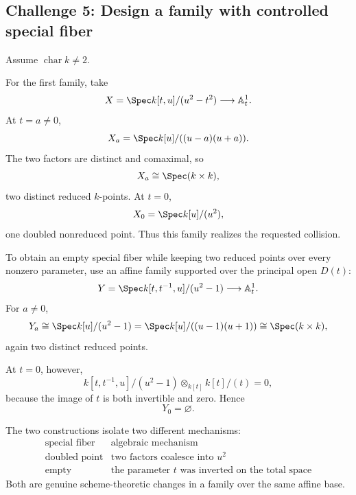 \subsection*{Challenge 5: Design a family with controlled special fiber}
\begin{solution}
Assume \(\operatorname{char}k\ne2\).

For the first family, take
\[
X=\Spec k[t,u]/(u^2-t^2)
\longrightarrow
\mathbb A^1_t.
\]
At \(t=a\ne0\),
\[
X_a=\Spec k[u]/((u-a)(u+a)).
\]
The two factors are distinct and comaximal, so
\[
X_a\cong\Spec(k\times k),
\]
two distinct reduced \(k\)-points.  At \(t=0\),
\[
X_0=\Spec k[u]/(u^2),
\]
one doubled nonreduced point.  Thus this family realizes the requested collision.

To obtain an empty special fiber while keeping two reduced points over every nonzero parameter, use an affine family supported over the principal open \(D(t)\):
\[
Y=\Spec k[t,t^{-1},u]/(u^2-1)
\longrightarrow
\mathbb A^1_t.
\]
For \(a\ne0\),
\[
Y_a
\cong
\Spec k[u]/(u^2-1)
=
\Spec k[u]/((u-1)(u+1))
\cong
\Spec(k\times k),
\]
again two distinct reduced points.

At \(t=0\), however,
\[
k[t,t^{-1},u]/(u^2-1)\otimes_{k[t]}k[t]/(t)=0,
\]
because the image of \(t\) is both invertible and zero.  Hence
\[
Y_0=\varnothing.
\]

The two constructions isolate two different mechanisms:
\[
\begin{array}{c|c}
\text{special fiber} & \text{algebraic mechanism}\\ \hline
\text{doubled point} & \text{two factors coalesce into }u^2\\
\text{empty} & \text{the parameter }t\text{ was inverted on the total space}
\end{array}
\]
Both are genuine scheme-theoretic changes in a family over the same affine base.
\end{solution}
